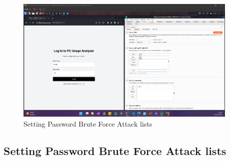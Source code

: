 \documentclass[11pt]{article}
\begin{document}
\begin{figure}[H]
    \centering
    \includegraphics[width=0.95\textwidth]{burpsuite (6).png}
    \caption{Setting Password Brute Force Attack lists}
    \label{fig:1}
\end{figure}
\subsection{Setting Password Brute Force Attack lists}



\end{document}
